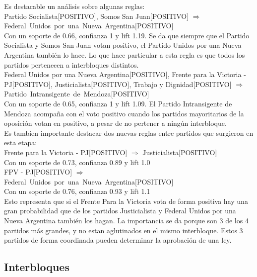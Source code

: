 \documentclass{endm}
\begin{document}
Es destacable un análisis sobre algunas reglas: \\

{Partido Socialista[POSITIVO], Somos San Juan[POSITIVO]} $\Longrightarrow$ \\ {Federal\ Unidos\ por\ una\ Nueva\ Argentina[POSITIVO]} \\

Con un soporte de 0.66, confianza 1 y lift 1.19. Se da que siempre que el Partido Socialista y Somos San Juan votan positivo, el Partido Unidos por una Nueva Argentina también lo hace. Lo que hace particular a esta regla es que todos los partidos pertenecen a interbloques distintos. \\


{Federal Unidos por una Nueva Argentina[POSITIVO], Frente para la Victoria - PJ[POSITIVO], Justicialista[POSITIVO], Trabajo y Dignidad[POSITIVO]}   $\Longrightarrow$ {Partido\ Intransigente\ de\ Mendoza[POSITIVO]} \\

Con un soporte de 0.65, confianza 1 y lift 1.09. El Partido Intransigente de Mendoza acompaña con el voto positivo cuando los partidos mayoritarios de la oposición votan en positivo, a pesar de no pertener a ningún interbloque. \\


Es tambien importante destacar dos nuevas reglas entre partidos que surgieron en esta etapa: \\

{Frente para la Victoria - PJ[POSITIVO]}  $\Longrightarrow$ {Justicialista[POSITIVO]} \\

Con un soporte de 0.73, confianza 0.89 y lift 1.0 \\

{FPV - PJ[POSITIVO]}  $\Longrightarrow$ {Federal\ Unidos\ por\ una\ Nueva\ Argentina[POSITIVO]} \\

Con un soporte de 0.76, confianza 0.93 y lift 1.1 \\

Esto representa que si el Frente Para la Victoria vota de forma positiva hay una gran probabilidad que de los partidos Justicialista y Federal Unidos por una Nueva Argentina también los hagan. La importancia se da porque son 3 de los 4 partidos más grandes, y no estan aglutinados en el mismo interbloque. Estos 3 partidos de forma coordinada pueden determinar la aprobación de una ley.


\subsection{Interbloques}
\end{document}
